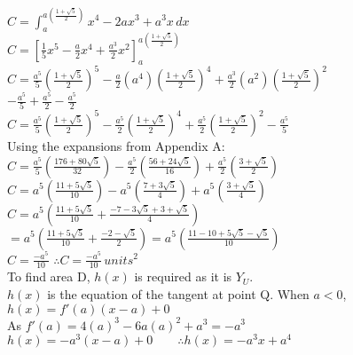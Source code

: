 \documentclass{homework}
\begin{document}
\begin{flushleft}
\begin{paracol}{2}
    $C=\int_{a}^{a(\frac{1+\sqrt{5}}{2})} x^4-2ax^3+a^3x\, dx $ \vspace{0.5em} \\
    $C=[\frac{1}{5}x^5-\frac{a}{2}x^4+\frac{a^3}{2}x^2]_{a}^{a(\frac{1+\sqrt{5}}{2})}$ \vspace{0.5em} \\
    $C=\frac{a^5}{5}(\frac{1+\sqrt{5}}{2})^5-\frac{a}{2}(a^4)(\frac{1+\sqrt{5}}{2})^4+\frac{a^3}{2}(a^2)(\frac{1+\sqrt{5}}{2})^2$ \vspace{0.5em}\\
    $-\frac{a^5}{5}+\frac{a^5}{2}
    -\frac{a^5}{2}$ \vspace{0.5em} \\
    $C=\frac{a^5}{5}(\frac{1+\sqrt{5}}{2})^5-\frac{a^5}{2}(\frac{1+\sqrt{5}}{2})^4+\frac{a^5}{2}(\frac{1+\sqrt{5}}{2})^2-\frac{a^5}{5}$ \vspace{0.5em} \\
    Using the expansions from Appendix A: \vspace{0.5em} \\
    $C=\frac{a^5}{5} (\frac{176 + 80\sqrt{5}}{32})-\frac{a^5}{2}(\frac{56 + 24 \sqrt{5}}{16})+\frac{a^5}{2}(\frac{3 + \sqrt{5}}{2})$ \vspace{0.5em} \\
    $C=a^5 (\frac{11 + 5\sqrt{5}}{10})-a^5(\frac{7 + 3 \sqrt{5}}{4})+a^5(\frac{3 + \sqrt{5}}{4})$ \vspace{0.5em} \\
    $C=a^5(\frac{11 + 5\sqrt{5}}{10}+\frac{-7 - 3\sqrt{5}+3+\sqrt{5}}{4})$ \vspace{0.5em} \\
    $=a^5(\frac{11 + 5\sqrt{5}}{10}+\frac{-2-\sqrt{5}}{2})=a^5(\frac{11-10+5\sqrt{5}-\sqrt{5}}{10})$ \vspace{0.5em} \\
    $C=\frac{-a^5}{10}$ \hspace{3em} 
    $\therefore C=\frac{-a^5}{10} \, units^2$ \vspace{1em}\\
    To find area D, $h(x)$ is required as it is $Y_U$. \vspace{0.5em}\\
    $h(x)$ is the equation of the tangent at point Q. When $a<0$, $h(x)=f'(a)(x-a)+0$ \vspace{0.5em}\\
    As $f'(a)=4(a)^3-6a(a)^2+a^3=-a^3$ \vspace{0.5em}\\
    $h(x)=-a^3(x-a)+0 \hspace{2em} \therefore h(x)=-a^3x+a^4$ \vspace{0.5em}\\

\end{paracol}
\end{flushleft}
\end{document}
